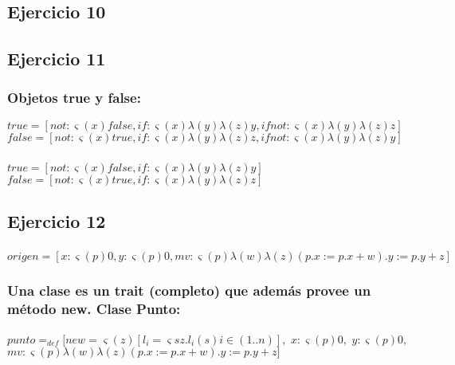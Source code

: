 \documentclass[10pt,a4paper]{article}
\begin{document}
\subsection{Ejercicio 10}
\subsection{Ejercicio 11}
\subsubsection{Objetos true y false:}
$
true = [not: \varsigma(x)false,if: \varsigma(x)\lambda(y)\lambda(z)y,ifnot: \varsigma(x)\lambda(y)\lambda(z)z]
$ \\
$
false = [not: \varsigma(x)true,if: \varsigma(x)\lambda(y)\lambda(z)z,ifnot: \varsigma(x)\lambda(y)\lambda(z)y]
$
\subsubsection{}
$
true = [not: \varsigma(x)false,if: \varsigma(x)\lambda(y)\lambda(z)y]
$ \\
$
false = [not: \varsigma(x)true,if: \varsigma(x)\lambda(y)\lambda(z)z]
$
\subsection{Ejercicio 12}
\subsubsection{}
$
origen = [x: \varsigma(p)0, y: \varsigma(p)0,mv: \varsigma(p)\lambda(w)\lambda(z) (p.x:=p.x+w).y:=p.y+z]
$
\subsubsection{Una clase es un trait (completo) que además provee un
método new. Clase Punto:}
$
punto =_{def} [new=\varsigma(z)[ l_{i} = \varsigma{s}z.l_{i}(s) i\in(1..n)],$  $x: \varsigma(p)0,$  $y: \varsigma(p)0,$  $mv: \varsigma(p)\lambda(w)\lambda(z) (p.x:=p.x+w).y:=p.y+z]
$
\end{document}
